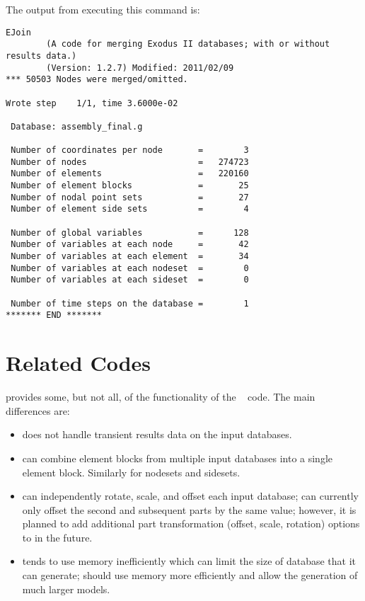 The output from executing this command is:
\begin{verbatim}
EJoin
        (A code for merging Exodus II databases; with or without results data.)
        (Version: 1.2.7) Modified: 2011/02/09
*** 50503 Nodes were merged/omitted.

Wrote step    1/1, time 3.6000e-02

 Database: assembly_final.g

 Number of coordinates per node       =        3
 Number of nodes                      =   274723
 Number of elements                   =   220160
 Number of element blocks             =       25
 Number of nodal point sets           =       27
 Number of element side sets          =        4

 Number of global variables           =      128
 Number of variables at each node     =       42
 Number of variables at each element  =       34
 Number of variables at each nodeset  =        0
 Number of variables at each sideset  =        0

 Number of time steps on the database =        1
******* END *******
\end{verbatim}

\section{Related Codes}
\ejoin{} provides some, but not all, of the functionality of the
~\cite{bib:gjoin} code. The main differences are:
\begin{itemize}
\item {} does not handle transient results data on the input
databases.
\item {} can combine element blocks from multiple input
databases into a single element block. Similarly for nodesets and
sidesets. 
\item {} can independently rotate, scale, and offset each 
input database; \ejoin{} can currently only offset the second and
subsequent parts by the same value; however, it is planned to add
additional part transformation (offset, scale, rotation) options to
\ejoin{} in the future.

\item {} tends to use memory inefficiently which can limit
the size of database that it can generate; \ejoin{} should use memory
more efficiently and allow the generation of much larger models.
\end{itemize}

